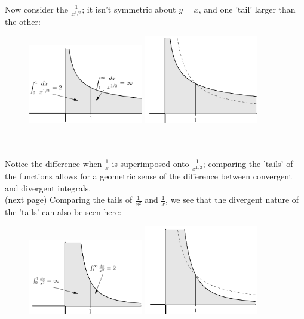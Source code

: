 \documentclass{report}
\begin{document}
Now consider the $\frac{1}{x^{1/2}}$; it isn't symmetric about $y=x$, and one 'tail' larger
than the other:
\begin{figure}[h]
\includegraphics[width=5cm]{Capture57}
\includegraphics[width=5cm]{Capture58}\\
\centering
{}\\
\end{figure}\\
Notice the difference when $\frac{1}{x}$ is superimposed onto
$\frac{1}{x^{1/2}}$; comparing the 'tails' of the functions allows for a geometric sense
of the difference between convergent and divergent integrals.\\
(next page)
\newpage
\noindent Comparing the tails of $\frac{1}{x^2}$ and $\frac{1}{x}$, we see that the divergent nature of 
the 'tails' can also be seen here:
\begin{figure}[h]
\includegraphics[width=5cm]{Capture59}
\includegraphics[width=5cm]{Capture60}\\
\centering
{}\\
\end{figure}
\newpage
\end{document}
